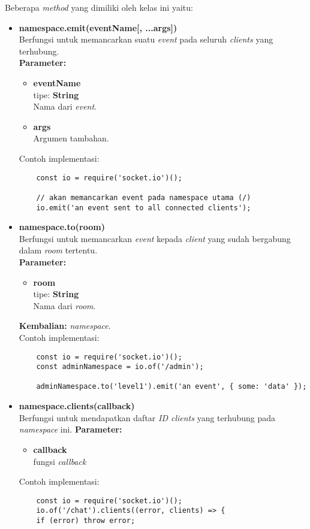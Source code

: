 \begin{enumerate}
	Beberapa \textit{method} yang dimiliki oleh kelas ini yaitu:
	\begin{itemize}
		\item \textbf{namespace.emit(eventName[, ...args])} \\
		Berfungsi untuk memancarkan suatu \textit{event} pada seluruh \textit{clients} yang terhubung. \\
		\textbf{Parameter:}
		\begin{itemize}
			\item \textbf{eventName} \\tipe: \textbf{String} \\ Nama dari \textit{event}.
			\item \textbf{args} \\ Argumen tambahan.
		\end{itemize}
		Contoh implementasi:
	\begin{lstlisting}
	const io = require('socket.io')();
		
	// akan memancarkan event pada namespace utama (/)
	io.emit('an event sent to all connected clients'); 
	\end{lstlisting}
		
		\item \textbf{namespace.to(room)} \\ 
		Berfungsi untuk memancarkan \textit{event} kepada \textit{client} yang sudah bergabung dalam \textit{room} tertentu. \\ 
		\textbf{Parameter:}
		\begin{itemize}
			\item \textbf{room} \\tipe: \textbf{String} \\ Nama dari \textit{room}.
		\end{itemize}
		\textbf{Kembalian:} \textit{namespace}. \\
		Contoh implementasi:
	\begin{lstlisting}
	const io = require('socket.io')();
	const adminNamespace = io.of('/admin');
	
	adminNamespace.to('level1').emit('an event', { some: 'data' });
	\end{lstlisting}
	
		\item \textbf{namespace.clients(callback)} \\
		Berfungsi untuk mendapatkan daftar \textit{ID clients} yang terhubung pada \textit{namespace} ini.
		\textbf{Parameter:}
		\begin{itemize}
			\item \textbf{callback} \\ fungsi \textit{callback}
		\end{itemize}
		Contoh implementasi:
	\begin{lstlisting}
	const io = require('socket.io')();
	io.of('/chat').clients((error, clients) => {
	if (error) throw error;
	

\end{lstlisting}
\end{itemize}
\end{enumerate}
